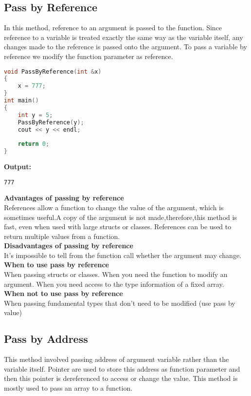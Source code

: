 \documentclass[11pt,fleqn]{book} %
\begin{document}
\subsection{Pass by Reference}
In this method, reference to an argument is passed to the function. Since reference to a variable is treated exactly the same way as the variable itself, any changes made to the reference is passed onto the argument. To pass a variable by reference we modify the function parameter as reference.\\
\begin{lstlisting}[language=C++, caption = Pass by reference]
void PassByReference(int &x)
{
	x = 777; 
}
int main()
{
	int y = 5;
	PassByReference(y); 
	cout << y << endl;
	
	return 0;
}
\end{lstlisting}
\textbf{Output:} 
\begin{lstlisting}
777
\end{lstlisting}
\textbf{Advantages of passing by reference}\\
References allow a function to change the value of the argument, which is sometimes useful.A copy of the argument is not made,therefore,this method is fast, even when used with large structs or classes.
References can be used to return multiple values from a function.\\
\textbf{Disadvantages of passing by reference}\\
It’s impossible to tell from the function call whether the argument may change.\\
\textbf{When to use pass by reference}\\
When passing structs or classes.
When you need the function to modify an argument.
When you need access to the type information of a fixed array.\\
\textbf{When not to use pass by reference}\\
When passing fundamental types that don’t need to be modified (use pass by value)
\subsection{Pass by Address}
This method involved passing address of argument variable rather than the variable itself. Pointer are used to store this address as function parameter and then this pointer is dereferenced to access or change the value. This method is mostly used to pass an array to a function.
\end{document}
